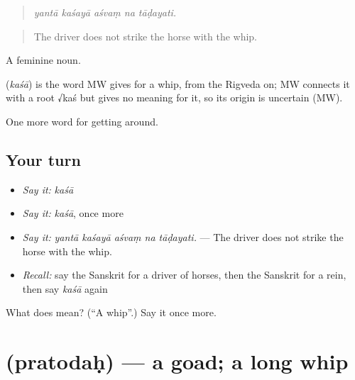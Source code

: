 \begin{quote}
    
\end{quote}

\begin{quote}
\emph{yantā kaśayā aśvaṃ na tāḍayati.}
\end{quote}

\begin{quote}
The driver does not strike the horse with the whip.
\end{quote}

A feminine noun.

\begin{cousinweb}
\textbf{} (\emph{kaśā}) is the word MW gives for a whip, from the Rigveda on; MW connects it with a root √kaś but gives no meaning for it, so its origin is uncertain (MW).
\end{cousinweb}

\begin{grammarlens}[title={What you've built}]
One more word for getting around.
\end{grammarlens}

\subsection*{Your turn}
\begin{itemize}
\raggedright
  \item \emph{Say it:} \emph{kaśā}
  \item \emph{Say it:} \emph{kaśā}, once more
  \item \emph{Say it:} \emph{yantā kaśayā aśvaṃ na tāḍayati.} — The driver does not strike the horse with the whip.
  \item \emph{Recall:} say the Sanskrit for a driver of horses, then the Sanskrit for a rein, then say \emph{kaśā} again
\end{itemize}

\begin{tcolorbox}[breakable,colback=teal!4,colframe=teal!35!black,title={Before you move on}]
What does  mean? (\textquotedblleft{}A whip\textquotedblright{}.) Say it once more.
\end{tcolorbox}
\section[\texorpdfstring{\sk{प्रतोदः} (pratodaḥ)}{प्रतोदः (pratodaḥ)}]{ (pratodaḥ) — a goad; a long whip}

